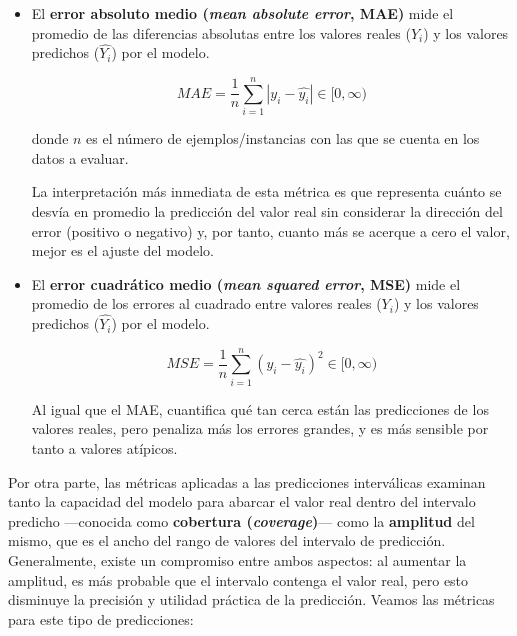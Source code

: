 \begin{itemize}
    \item El \textbf{error absoluto medio (\textit{mean absolute error}, MAE)} mide el promedio de las diferencias absolutas entre los valores reales ($Y_i$) y los valores predichos ($\hat{Y_i}$) por el modelo.

    $$
    MAE = \frac{1}{n} \sum_{i=1}^n{|y_i - \hat{y_i}|} \in [0, \infty)
    $$

    donde $n$ es el número de ejemplos/instancias con las que se cuenta en los datos a evaluar.

    La interpretación más inmediata de esta métrica es que representa cuánto se desvía en promedio la predicción del valor real sin considerar la dirección del error (positivo o negativo) y, por tanto, cuanto más se acerque a cero el valor, mejor es el ajuste del modelo.

    \item El \textbf{error cuadrático medio (\textit{mean squared error}, MSE)} mide el promedio de los errores al cuadrado entre valores reales ($Y_i$) y los valores predichos ($\hat{Y_i}$) por el modelo.
    
    $$
    MSE = \frac{1}{n} \sum_{i=1}^n{(y_i - \hat{y_i})^2} \in [0, \infty)
    $$

    Al igual que el MAE, cuantifica qué tan cerca están las predicciones de los valores reales, pero penaliza más los errores grandes, y es más sensible por tanto a valores atípicos.

\end{itemize}


Por otra parte, las métricas aplicadas a las predicciones interválicas examinan tanto la capacidad del modelo para abarcar el valor real dentro del intervalo predicho ---conocida como \textbf{cobertura (\textit{coverage})}--- como la \textbf{amplitud} del mismo, que es el ancho del rango de valores del intervalo de predicción. Generalmente, existe un compromiso entre ambos aspectos: al aumentar la amplitud, es más probable que el intervalo contenga el valor real, pero esto disminuye la precisión y utilidad práctica de la predicción. Veamos las métricas para este tipo de predicciones: 

